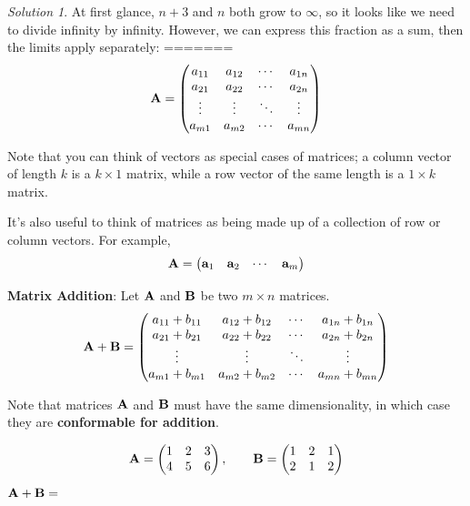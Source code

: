 \documentclass[]{book}
\theoremstyle{definition}
\theoremstyle{definition}
\theoremstyle{definition}
\theoremstyle{remark}
\newtheorem*{solution}{Solution}
\begin{document}
\begin{solution}
{}At first glance, \(n + 3\) and \(n\) both grow to \(\infty\), so it looks like we need to divide infinity by infinity. However, we can express this fraction as a sum, then the limits apply separately:
=======
\[{\bf A}=\begin{pmatrix}
            a_{11} & a_{12} & \cdots & a_{1n} \\
            a_{21} & a_{22} & \cdots & a_{2n} \\
            \vdots & \vdots & \ddots & \vdots \\
            a_{m1} & a_{m2} & \cdots & a_{mn}
        \end{pmatrix}\]

Note that you can think of vectors as special cases of matrices; a column vector of length \(k\) is a \(k \times 1\) matrix, while a row vector of the same length is a \(1 \times k\) matrix.

It's also useful to think of matrices as being made up of a collection of row or column vectors. For example,
\[\bf A = \begin{pmatrix} {\bf a}_1 & {\bf a}_2 &  \cdots & {\bf a}_m \end{pmatrix}\]

\textbf{Matrix Addition}: Let \(\bf A\) and \(\bf B\) be two \(m\times n\) matrices.
\[{\bf A+B}=\begin{pmatrix}
            a_{11}+b_{11} & a_{12}+b_{12} & \cdots & a_{1n}+b_{1n} \\
            a_{21}+b_{21} & a_{22}+b_{22} & \cdots & a_{2n}+b_{2n} \\
            \vdots & \vdots  & \ddots & \vdots \\
            a_{m1}+b_{m1} & a_{m2}+b_{m2} & \cdots & a_{mn}+b_{mn}
        \end{pmatrix}\]

Note that matrices \({\bf A}\) and \({\bf B}\) must have the same dimensionality, in which case they are \textbf{conformable for addition}.

\protect\hypertarget{exm:matrixaddition}{}{\label{exm:matrixaddition} }\[{\bf A}=\begin{pmatrix} 1 & 2 & 3 \\ 4 & 5 & 6 \end{pmatrix}, \qquad
            {\bf B}=\begin{pmatrix} 1 & 2 & 1 \\ 2 & 1 & 2 \end{pmatrix}\]
\({\bf A+B}=\)


\end{solution}
\end{document}
